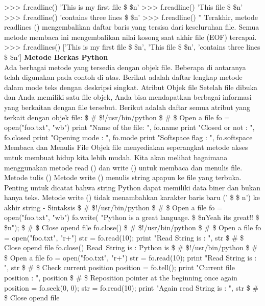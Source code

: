 >>> f.readline()  
'This is my first file \$  \setminus  \$n'  
>>> f.readline()  
'This file \$  \setminus  \$n'  
>>> f.readline()  
'contains three lines \$  \setminus  \$n' 
>>> f.readline()  
'' 
Terakhir, metode readlines () mengembalikan daftar baris yang tersisa dari keseluruhan file. Semua metode membaca ini mengembalikan nilai kosong saat akhir file (EOF) tercapai.  
>>> f.readlines()  
['This is my first file \$  \setminus  \$n', 'This file \$  \setminus  \$n', 'contains three lines \$  \setminus  \$n'] 
{\fontsize{14pt}{14pt}\selectfont \textbf{Metode Berkas Python} \\} 
Ada berbagai metode yang tersedia dengan objek file. Beberapa di antaranya telah digunakan pada contoh di atas. Berikut adalah daftar lengkap metode dalam mode teks dengan deskripsi singkat. Atribut Objek file Setelah file dibuka dan Anda memiliki satu file objek, Anda bisa mendapatkan berbagai informasi yang berkaitan dengan file tersebut. Berikut adalah daftar semua atribut yang terkait dengan objek file: 
 \$  \#  \$!/usr/bin/python 
 \$  \#  \$ Open a file  
fo = open("foo.txt", "wb") 
print "Name of the file: ", fo.name 
print "Closed or not : ", fo.closed 
print "Opening mode : ", fo.mode 
print "Softspace flag : ", fo.softspace  
Membaca dan Menulis File 
Objek file menyediakan seperangkat metode akses untuk membuat hidup kita lebih mudah. Kita akan melihat bagaimana menggunakan metode read () dan write () untuk membaca dan menulis file. Metode tulis () Metode write () menulis string apapun ke file yang terbuka. Penting untuk dicatat bahwa string Python dapat memiliki data biner dan bukan hanya teks. Metode write () tidak menambahkan karakter baris baru (' \$  \setminus  \$ n') ke akhir string - 
Sintaksis 
 \$  \#  \$!/usr/bin/python 
 \$  \#  \$ Open a file  
fo = open("foo.txt", "wb") 
fo.write( "Python is a great language. \$  \setminus  \$nYeah its great!! \$  \setminus  \$n");  
 \$  \#  \$ Close opend file  
fo.close()  
 \$  \#  \$!/usr/bin/python  
 \$  \#  \$ Open a file 
fo = open("foo.txt", "r+") 
str = fo.read(10); 
print "Read String is : ", str 
 \$  \#  \$ Close opend file 
fo.close()  
Read~String is :  Python is 
 \$  \#  \$!/usr/bin/python 
 \$  \#  \$ Open a file  
fo = open("foo.txt", "r+") 
str = fo.read(10);
print "Read String is : ", str 
 \$  \#  \$ Check current position 
position = fo.tell(); 
print "Current file position : ", position 
 \$  \#  \$ Reposition pointer at the beginning once again  
position = fo.seek(0, 0);  
str = fo.read(10); 
print "Again read String is : ", str 
 \$  \#  \$ Close opend file 

